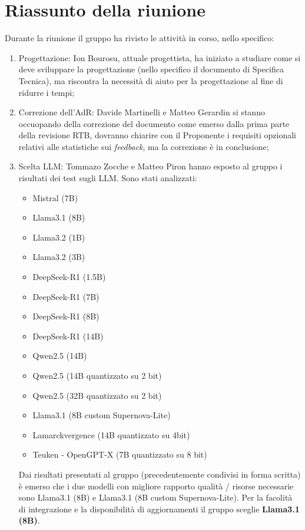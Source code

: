 \section{Riassunto della riunione}
Durante la riunione il gruppo ha rivisto le attività in corso, nello specifico:
\begin{enumerate}


    \item Progettazione: Ion Bourosu, attuale progettista, ha iniziato a studiare come si deve sviluppare la progettazione (nello specifico il documento di Specifica Tecnica), ma riscontra la necessità di aiuto per la progettazione al fine di ridurre i tempi;
    \item Correzione dell'AdR: Davide Martinelli e Matteo Gerardin si stanno occuopando della correzione del documento come emerso dalla prima parte della revisione RTB, dovranno chiarire con il Proponente i requisiti opzionali relativi alle statistiche sui \textit{feedback}, ma la correzione è in conclusione;
    \item Scelta LLM: Tommazo Zocche e Matteo Piron hanno esposto al gruppo i risultati dei test sugli LLM. Sono stati analizzati:
\begin{multicols}{2}
    \begin{itemize}
        \item Mistral (7B)
        \item Llama3.1 (8B)
        \item Llama3.2 (1B)
        \item Llama3.2 (3B)
        \item DeepSeek-R1 (1.5B)
        \item DeepSeek-R1 (7B)
        \item DeepSeek-R1 (8B)
        \item DeepSeek-R1 (14B)
        \item Qwen2.5 (14B)
        \item Qwen2.5 (14B quantizzato su 2 bit)
        \item Qwen2.5 (32B quantizzato su 2 bit)
        \item Llama3.1 (8B custom Supernova-Lite)
        \item Lamarckvergence (14B quantizzato su 4bit)
        \item Teuken - OpenGPT-X (7B quantizzato su 8 bit)
    \end{itemize}
\end{multicols}
    Dai risultati presentati al gruppo (precedentemente condivisi in forma scritta) è emerso che i due modelli con migliore rapporto qualità / risorse necessarie sono Llama3.1 (8B) e Llama3.1 (8B custom Supernova-Lite). Per la facolità di integrazione e la disponibilità di aggiornamenti il gruppo sceglie \textbf{Llama3.1 (8B)}.

\end{enumerate}
